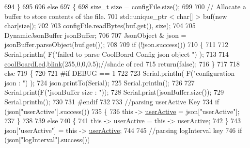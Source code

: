 \begin{DoxyCode}
694     \}
695 
696     \textcolor{keywordflow}{else}
697     \{
698         \textcolor{keywordtype}{size\_t} size = configFile.size();
699 
700         \textcolor{comment}{// Allocate a buffer to store contents of the file.}
701         std::unique\_ptr < char[] > buf(\textcolor{keyword}{new} \textcolor{keywordtype}{char}[size]);
702 
703         configFile.readBytes(buf.get(), size);
704 
705         DynamicJsonBuffer jsonBuffer;
706 
707         JsonObject & json = jsonBuffer.parseObject(buf.get());
708 
709         \textcolor{keywordflow}{if} (!json.success())
710         \{
711         
712             Serial.println( F(\textcolor{stringliteral}{"failed to parse CoolBoard Config json object "}) );
713     
714             \hyperlink{class_cool_board_a1b1d3c684a5baa56b08486e192fd8e97}{coolBoardLed}.\hyperlink{class_cool_board_led_a96e1ea13003eee34c9dbcef340404426}{blink}(255,0,0,0.5);\textcolor{comment}{//shade of red     }
715             \textcolor{keywordflow}{return}(\textcolor{keyword}{false});
716         \}
717 
718         \textcolor{keywordflow}{else}
719         \{   
720         
721 \textcolor{preprocessor}{        #if DEBUG == 1}
722             
723             Serial.println( F(\textcolor{stringliteral}{"configuration json : "}) );
724             json.printTo(Serial);
725             Serial.println();
726             
727             Serial.print(F(\textcolor{stringliteral}{"jsonBuffer size : "}));
728             Serial.print(jsonBuffer.size());
729             Serial.println();
730 
731 \textcolor{preprocessor}{        #endif}
732             
733             \textcolor{comment}{//parsing userActive Key}
734             \textcolor{keywordflow}{if} (json[\textcolor{stringliteral}{"userActive"}].success())
735             \{
736                 \textcolor{keyword}{this} -> \hyperlink{class_cool_board_a6395459131d6889a3005f79c7a35e964}{userActive} = json[\textcolor{stringliteral}{"userActive"}];
737             \}
738 
739             \textcolor{keywordflow}{else}
740             \{
741                 \textcolor{keyword}{this} -> \hyperlink{class_cool_board_a6395459131d6889a3005f79c7a35e964}{userActive} = \textcolor{keyword}{this} -> \hyperlink{class_cool_board_a6395459131d6889a3005f79c7a35e964}{userActive};
742             \}
743             json[\textcolor{stringliteral}{"userActive"}] = \textcolor{keyword}{this} -> \hyperlink{class_cool_board_a6395459131d6889a3005f79c7a35e964}{userActive};
744 
745             \textcolor{comment}{//parsing logInterval key}
746             \textcolor{keywordflow}{if} (json[\textcolor{stringliteral}{"logInterval"}].success())

\end{DoxyCode}
